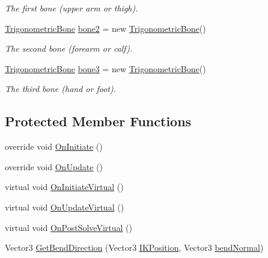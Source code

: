 \begin{DoxyCompactItemize}
\begin{DoxyCompactList}\small\item\em The first bone (upper arm or thigh). \end{DoxyCompactList}\item 
\mbox{\hyperlink{class_root_motion_1_1_final_i_k_1_1_i_k_solver_trigonometric_1_1_trigonometric_bone}{Trigonometric\+Bone}} \mbox{\hyperlink{class_root_motion_1_1_final_i_k_1_1_i_k_solver_trigonometric_a27296f269cce9e3806879ffc67778525}{bone2}} = new \mbox{\hyperlink{class_root_motion_1_1_final_i_k_1_1_i_k_solver_trigonometric_1_1_trigonometric_bone}{Trigonometric\+Bone}}()
\begin{DoxyCompactList}\small\item\em The second bone (forearm or calf). \end{DoxyCompactList}\item 
\mbox{\hyperlink{class_root_motion_1_1_final_i_k_1_1_i_k_solver_trigonometric_1_1_trigonometric_bone}{Trigonometric\+Bone}} \mbox{\hyperlink{class_root_motion_1_1_final_i_k_1_1_i_k_solver_trigonometric_ac8cfb2c6ba0009f99bfde09b6b174a3a}{bone3}} = new \mbox{\hyperlink{class_root_motion_1_1_final_i_k_1_1_i_k_solver_trigonometric_1_1_trigonometric_bone}{Trigonometric\+Bone}}()
\begin{DoxyCompactList}\small\item\em The third bone (hand or foot). \end{DoxyCompactList}\end{DoxyCompactItemize}
\subsection*{Protected Member Functions}
\begin{DoxyCompactItemize}
\item 
override void \mbox{\hyperlink{class_root_motion_1_1_final_i_k_1_1_i_k_solver_trigonometric_a57ee7178a992a1a4e32387f19af6227f}{On\+Initiate}} ()
\item 
override void \mbox{\hyperlink{class_root_motion_1_1_final_i_k_1_1_i_k_solver_trigonometric_afb9ab7130f7ad4305f5eda94524cc5b6}{On\+Update}} ()
\item 
virtual void \mbox{\hyperlink{class_root_motion_1_1_final_i_k_1_1_i_k_solver_trigonometric_af11d3885dee47e31be9f069355d0ce67}{On\+Initiate\+Virtual}} ()
\item 
virtual void \mbox{\hyperlink{class_root_motion_1_1_final_i_k_1_1_i_k_solver_trigonometric_a0be97e7ca173129544d6e8dca5e2c37d}{On\+Update\+Virtual}} ()
\item 
virtual void \mbox{\hyperlink{class_root_motion_1_1_final_i_k_1_1_i_k_solver_trigonometric_aa934d2fe8f3b8193e2f44254cbf48998}{On\+Post\+Solve\+Virtual}} ()
\item 
Vector3 \mbox{\hyperlink{class_root_motion_1_1_final_i_k_1_1_i_k_solver_trigonometric_aa3fcb680c0e3e22f6591a5bbcd1294ed}{Get\+Bend\+Direction}} (Vector3 \mbox{\hyperlink{class_root_motion_1_1_final_i_k_1_1_i_k_solver_ab8cb39df45e14434ce7a18f2ca207ca7}{I\+K\+Position}}, Vector3 \mbox{\hyperlink{class_root_motion_1_1_final_i_k_1_1_i_k_solver_trigonometric_ae48bca2ec4e7a16ffaf196ea956be5e9}{bend\+Normal}})
\end{DoxyCompactItemize}
